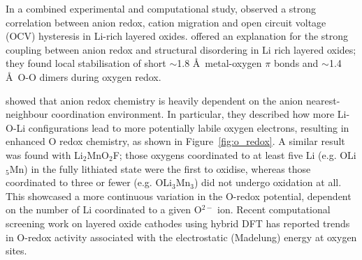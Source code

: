 \documentclass[../main.tex]{subfiles}
\begin{document}
In a combined experimental and computational study, \citeauthor{Gent2017} observed a strong correlation between anion redox, cation migration and open circuit voltage (OCV) hysteresis in Li-rich layered oxides.\cite{Gent2017} \citeauthor{Hong2019} offered an explanation for the strong coupling between anion redox and structural disordering in Li rich layered oxides; they found local stabilisation of short $\sim$1.8 \AA \ metal-oxygen $\pi$ bonds and $\sim$1.4 \AA \ O-O dimers during oxygen redox.\cite{Hong2019}

\citeauthor{Seo2016} showed that anion redox chemistry is heavily dependent on the anion nearest-neighbour coordination environment.\cite{Seo2016} In particular, they described how more Li-O-Li configurations lead to more potentially labile oxygen electrons, resulting in enhanced O redox chemistry, as shown in Figure~\ref{fig:o_redox}. A similar result was found with Li$_2$MnO$_2$F; those oxygens coordinated to at least five Li (e.g. OLi$_5$Mn) in the fully lithiated state were the first to oxidise, whereas those coordinated to three or fewer (e.g. OLi$_3$Mn$_3$) did not undergo oxidation at all. This showcased a more continuous variation in the O-redox potential, dependent on the number of Li coordinated to a given O$^{2-}$ ion.\cite{Sharpe2020} Recent computational screening work on layered oxide cathodes using hybrid DFT has reported trends in O-redox activity associated with the electrostatic (Madelung) energy at oxygen sites.\cite{Davies2020}
\end{document}
